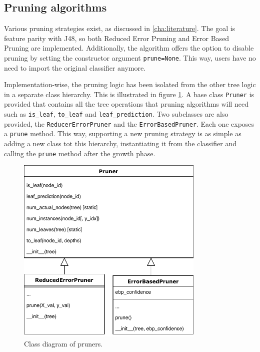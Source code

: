 \subsection{Pruning algorithms}
Various pruning strategies exist, as discussed in \autoref{cha:literature}. The goal is feature parity with J48, so both Reduced Error Pruning and Error Based Pruning are implemented. Additionally, the algorithm offers the option to disable pruning by setting the constructor argument \texttt{prune=None}. This way, users have no need to import the original classifier anymore.

Implementation-wise, the pruning logic has been isolated from the other tree logic in a separate class hierarchy. This is illustrated in figure \ref{fig:pruner_classes}. A base class \texttt{Pruner} is provided that contains all the tree operations that pruning algorithms will need such as \texttt{is\_leaf}, \texttt{to\_leaf} and \texttt{leaf\_prediction}. Two subclasses are also provided, the \texttt{ReducerErrorPruner} and the \texttt{ErrorBasedPruner}. Each one exposes a \texttt{prune} method. This way, supporting a new pruning strategy is as simple as adding a new class tot this hierarchy, instantiating it from the classifier and calling the \texttt{prune} method after the growth phase.

\begin{figure}[htp]
    \centering
    \includegraphics[width=0.8\textwidth]{img/PrunerClasses.pdf}
    \caption{Class diagram of pruners.}%
    \label{fig:pruner_classes}
\end{figure}

